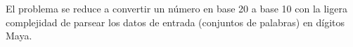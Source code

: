 \editorialText

El problema se reduce a convertir un n\'umero en base 20 a base 10 con la ligera complejidad de parsear los datos de entrada (conjuntos de palabras) en d\'igitos Maya.

